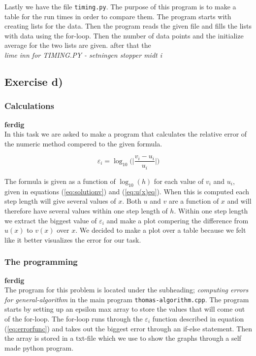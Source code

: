 \documentclass{article}
\begin{document}
    Lastly we have the file \texttt{timing.py}. The purpose of this program is to make a table for the run times in order to compare them. The program starts with creating lists for the data. Then the program reads the given file and fills the lists with data using the for-loop. Then the number of data points and the initialize average for the two lists are given. after that the \\


    {\large  \it lime inn for TIMING.PY - setningen stopper midt i}


\subsection{Exercise d)} \label{sec:Method d)}

  \subsubsection{Calculations}

    {\bf ferdig} \\

    In this task we are asked to make a program that calculates the relative error of the numeric method compered to the given formula.

    \begin{equation}
      \varepsilon_i = \log_{10} \bigg( \bigg| \frac{v_i - u_i}{u_i} \bigg| \bigg)    \label{eq:errorfunc}
    \end{equation}

    The formula is given as a function of $\log_{10}(h)$ for each value of $v_i$ and $u_i$, given in equations (\ref{eq:solutionv}) and (\ref{eq:u(x)eq}). When this is computed each step length will give several values of $x$. Both $u$ and $v$ are a function of $x$ and will therefore have several values within one step length of $h$. Within one step length we extract the biggest value of $\varepsilon_i$ and make a plot compering the difference from $u(x)$ to $v(x)$ over $x$. We decided to make a plot over a table because we felt like it better visualizes the error for our task.


  \subsubsection{The programming}

    {\bf ferdig} \\

    The program for this problem is located under the subheading; \textit{computing errors for general-algorithm} in the main program \texttt{thomas-algorithm.cpp}. The program starts by setting up an epsilon max array to store the values that will come out of the for-loop. The for-loop runs through the $\varepsilon_i$ function described in equation (\ref{eq:errorfunc}) and takes out the biggest error through an if-else statement. Then the array is stored in a txt-file which we use to show the graphs through a self made python program. \\
\end{document}
